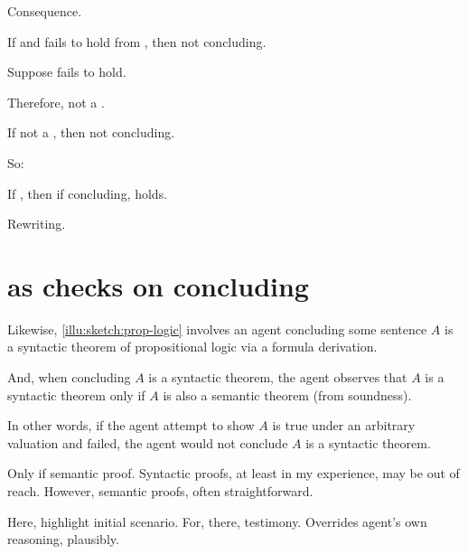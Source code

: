 \begin{note}
  Consequence.

  \begin{proposition}
    If \requ{} and \ros{} fails to hold from \agpe{}, then not concluding.
    \begin{argument}
      Suppose \ros{} fails to hold.

      Therefore, not a \fc{}.

      If not a \fc{}, then not concluding.
    \end{argument}
  \end{proposition}

  So:

  \begin{proposition}
    If \requ{}, then if concluding, \ros{} holds.

    \begin{argument}
      Rewriting.
    \end{argument}
  \end{proposition}
\end{note}


\section{ as checks on concluding}
\label{cha:zS:sec:curbs:checks}


\begin{note}
  Likewise, \autoref{illu:sketch:prop-logic} involves an agent concluding some sentence \(A\) is a syntactic theorem of propositional logic via a formula derivation.

  And, when concluding \(A\) is a syntactic theorem, the agent observes that \(A\) is a syntactic theorem only if \(A\) is also a semantic theorem (from soundness).

  In other words, if the agent attempt to show \(A\) is true under an arbitrary valuation and failed, the agent would not conclude \(A\) is a syntactic theorem.

  Only if semantic proof.
  Syntactic proofs, at least in my experience, may be out of reach.
  However, semantic proofs, often straightforward.
\end{note}

\begin{note}
  Here, highlight initial scenario.
  For, there, testimony.
  Overrides agent's own reasoning, plausibly.
\end{note}

